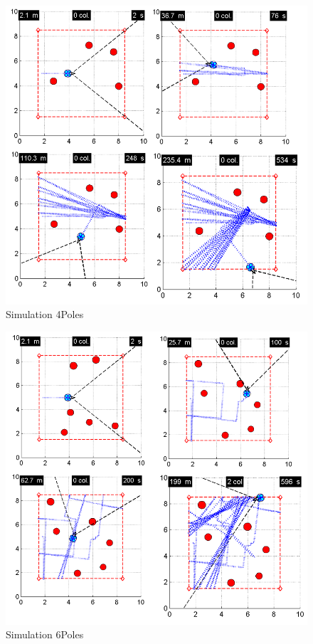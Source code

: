 \begin{figure}[h]
\includegraphics[width=0.8\linewidth]{Figures/Simulation_4Poles.png}
\centering
\caption{Simulation 4Poles}
\label{f:Simulation_4Poles}
\end{figure}

\begin{figure}[h]
\includegraphics[width=0.8\linewidth]{Figures/Simulation_6Poles.png}
\centering
\caption{Simulation 6Poles}
\label{f:Simulation_6Poless}
\end{figure}

